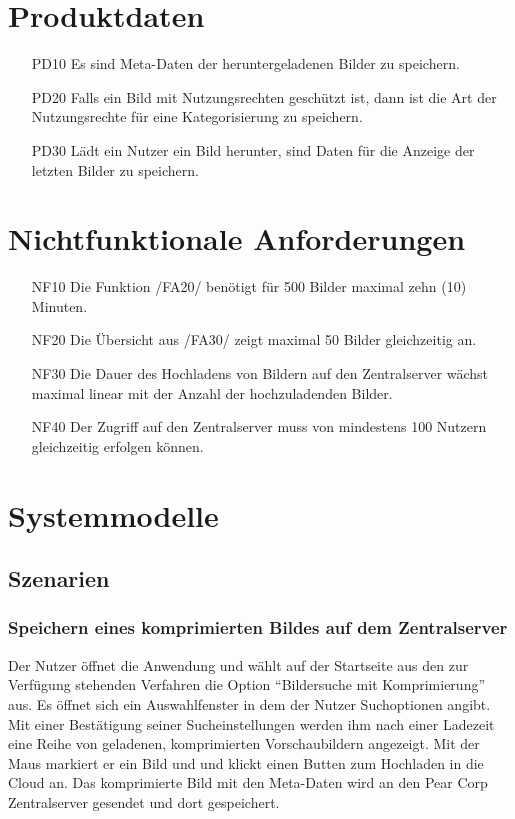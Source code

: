 \documentclass[parskip=full]{scrartcl}
\begin{document}
\section{Produktdaten}
\begin{itemize}[nosep]
\item[PD10] Es sind Meta-Daten der heruntergeladenen Bilder zu speichern.
\item[PD20] Falls ein Bild mit Nutzungsrechten geschützt ist, dann ist die Art der Nutzungsrechte für eine Kategorisierung zu speichern.
\item[PD30] Lädt ein Nutzer ein Bild herunter, sind Daten für die Anzeige der letzten Bilder zu speichern.
\end{itemize}

\section{Nichtfunktionale Anforderungen}
\begin{itemize}[nosep]
\item[NF10] Die Funktion /FA20/ benötigt für 500 Bilder maximal zehn (10) Minuten.
\item[NF20] Die Übersicht aus /FA30/ zeigt maximal 50 Bilder gleichzeitig an.
\item[NF30] Die Dauer des Hochladens von Bildern auf den Zentralserver wächst maximal linear mit der Anzahl der hochzuladenden Bilder.
\item[NF40] Der Zugriff auf den Zentralserver muss von mindestens 100 Nutzern gleichzeitig erfolgen können.
\end{itemize}

\section{Systemmodelle}

\subsection{Szenarien}
\subsubsection{Speichern eines komprimierten Bildes auf dem Zentralserver}
Der Nutzer öffnet die Anwendung und wählt auf der Startseite aus den zur Verfügung stehenden Verfahren die Option \enquote{Bildersuche mit Komprimierung} aus. Es öffnet sich ein Auswahlfenster in dem der Nutzer Suchoptionen angibt. Mit einer Bestätigung seiner Sucheinstellungen werden ihm nach einer Ladezeit eine Reihe von geladenen, komprimierten Vorschaubildern angezeigt. Mit der Maus markiert er ein Bild und und klickt einen Butten zum Hochladen in die \Gls{Cloud} an. Das komprimierte Bild mit den \Gls{Meta-Daten} wird an den Pear Corp Zentralserver gesendet und dort gespeichert.
\end{document}
